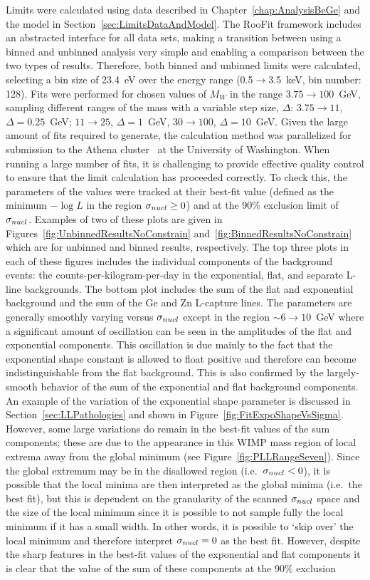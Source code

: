 Limits were calculated using data described in Chapter~\ref{chap:AnalysisBeGe} and the model in Section~\ref{sec:LimitsDataAndModel}.  The RooFit framework includes an abstracted interface for all data sets, making a transition between using a binned and unbinned analysis very simple and enabling a comparison between the two types of results.  Therefore, both binned and unbinned limits were calculated, selecting a bin size of 23.4~eV over the energy range (0.5$\to$3.5~keV, bin number: 128).  
Fits were performed for chosen values of $M_{W}$ in the range $3.75\to100$~GeV, sampling different ranges of the mass with a variable step size, $\Delta$: $3.75\to11$, $\Delta=0.25$~GeV; $11\to25$, $\Delta=1$~GeV, $30\to100$, $\Delta=10$~GeV.  Given the large amount of fits required to generate, the calculation method was parallelized for submission to the Athena cluster~\cite{Athena} at the University of Washington.  When running a large number of fits, it is challenging to provide effective quality control to ensure that the limit calculation has proceeded correctly.  To check this, the parameters of the values were tracked at their best-fit value (defined as the minimum $-\log L$ in the region $\sigma_{nucl}\geq0$) and at the 90\% exclusion limit of $\sigma_{nucl}$.  Examples of two of these plots are given in Figures~\ref{fig:UnbinnedResultsNoConstrain} and~\ref{fig:BinnedResultsNoConstrain} which are for unbinned and binned results, respectively.  The top three plots in each of these figures includes the individual components of the background events: the counts-per-kilogram-per-day in the exponential, flat, and separate L-line backgrounds.  The bottom plot includes the sum of the flat and exponential background and the sum of the Ge and Zn L-capture lines.  The parameters are generally smoothly varying versus $\sigma_{nucl}$ except in the region $\sim6\to10$~GeV where a significant amount of oscillation can be seen in the amplitudes of the flat and exponential components.  This oscillation is due mainly to the fact that the exponential shape constant is allowed to float positive and therefore can become indistinguishable from the flat background.  This is also confirmed by the largely-smooth behavior of the sum of the exponential and flat background components.  An example of the variation of the exponential shape parameter is discussed in Section~\ref{sec:LLPathologies} and shown in Figure~\ref{fig:FitExpoShapeVsSigma}.  However, some large variations do remain in the best-fit values of the sum components; these are due to the appearance in this WIMP mass region of local extrema away from the global minimum (see Figure~\ref{fig:PLLRangeSeven}).  Since the global extremum may be in the disallowed region (i.e.~$\sigma_{nucl}<0$), it is possible that the local minima are then interpreted as the global minima (i.e.~the best fit), but this is dependent on the granularity of the scanned $\sigma_{nucl}$ space and the size of the local minimum since it is possible to not sample fully the local minimum if it has a small width.  In other words, it is possible to `skip over' the local minimum and therefore interpret $\sigma_{nucl}=0$ as the best fit.  However, despite the sharp features in the best-fit values of the exponential and flat components it is clear that the value of the sum of these components at the 90\% exclusion 